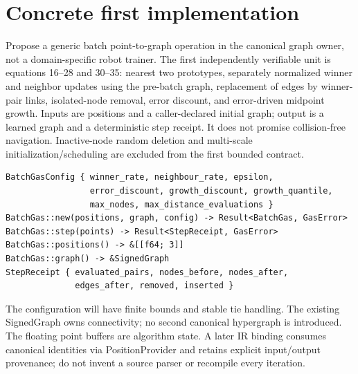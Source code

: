 \documentclass{article}
\begin{document}
\section*{Concrete first implementation}
Propose a generic batch point-to-graph operation in the canonical graph owner,
not a domain-specific robot trainer. The first independently verifiable unit
is equations 16--28 and 30--35: nearest two prototypes, separately normalized
winner and neighbor updates using the pre-batch graph, replacement of edges by
winner-pair links, isolated-node removal, error discount, and error-driven
midpoint growth. Inputs are positions and a caller-declared initial graph;
output is a learned graph and a deterministic step receipt. It does not promise
collision-free navigation. Inactive-node random deletion and multi-scale
initialization/scheduling are excluded from the first bounded contract.
\begin{verbatim}
BatchGasConfig { winner_rate, neighbour_rate, epsilon,
                 error_discount, growth_discount, growth_quantile,
                 max_nodes, max_distance_evaluations }
BatchGas::new(positions, graph, config) -> Result<BatchGas, GasError>
BatchGas::step(points) -> Result<StepReceipt, GasError>
BatchGas::positions() -> &[[f64; 3]]
BatchGas::graph() -> &SignedGraph
StepReceipt { evaluated_pairs, nodes_before, nodes_after,
              edges_after, removed, inserted }
\end{verbatim}
The configuration will have finite bounds and stable tie handling. The existing
SignedGraph owns connectivity; no second canonical hypergraph is introduced.
The floating point buffers are algorithm state. A later IR binding consumes
canonical identities via PositionProvider and retains explicit input/output
provenance; do not invent a source parser or recompile every iteration.
\end{document}
